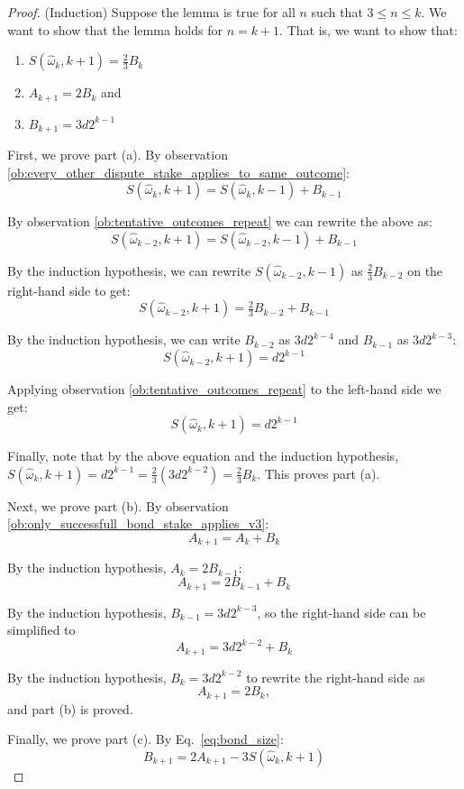 \documentclass[floatfix,reprint,nofootinbib,amsmath,amssymb,epsfig,pre,floats,letterpaper,groupedaffiliation]{revtex4-1}
\theoremstyle{definition}
\theoremstyle{definition}
\begin{document}
\begin{appendix}
\begin{proof}
\vspace{4mm}

(Induction)
Suppose the lemma is true for all $n$ such that $3 \leq n \leq k$.  We want to show that the lemma holds for $n=k+1$.  That is, we want to show that:

\begin{enumerate}[label=(\alph*)]
\item{$S(\hat{\omega}_{k},k+1)=\frac{2}{3}B_{k}$}
\item{$A_{k+1}=2B_{k}$ and}
\item{$B_{k+1}=3d2^{k-1}$}
\end{enumerate}

First, we prove part (a). By observation \ref{ob:every_other_dispute_stake_applies_to_same_outcome}:
\[ S(\hat{\omega}_{k},k+1)=S(\hat{\omega}_{k},k-1)+B_{k-1} \]

By observation \ref{ob:tentative_outcomes_repeat} we can rewrite the above as:
\[ S(\hat{\omega}_{k-2},k+1)=S(\hat{\omega}_{k-2},k-1)+B_{k-1} \]

By the induction hypothesis, we can rewrite $S(\hat{\omega}_{k-2},k-1)$ as $\frac{2}{3}B_{k-2}$ on the right-hand side to get:
\[ S(\hat{\omega}_{k-2},k+1)=\tfrac{2}{3}B_{k-2}+B_{k-1} \]

By the induction hypothesis, we can write $B_{k-2}$ as $3d2^{k-4}$ and $B_{k-1}$ as $3d2^{k-3}$:
\[ S(\hat{\omega}_{k-2},k+1)=d2^{k-1} \]

Applying observation \ref{ob:tentative_outcomes_repeat} to the left-hand side we get:
\[ S(\hat{\omega}_{k},k+1)=d2^{k-1} \]

Finally, note that by the above equation and the induction hypothesis, $S(\hat{\omega}_{k},k+1)=d2^{k-1}=\frac{2}{3}(3d2^{k-2})=\frac{2}{3}B_{k}$. This proves part (a).

Next, we prove part (b). By observation \ref{ob:only_successfull_bond_stake_applies_v3}:
\[ A_{k+1}=A_{k}+B_{k} \]

By the induction hypothesis, $A_{k}=2B_{k-1}$:
\[ A_{k+1}=2B_{k-1}+B_{k} \]

By the induction hypothesis, $B_{k-1}=3d2^{k-3}$, so the right-hand side can be simplified to
\[ A_{k+1}=3d2^{k-2}+B_k \]

By the induction hypothesis, $B_{k}=3d2^{k-2}$ to rewrite the right-hand side as
\[ A_{k+1}=2B_{k}, \]
and part (b) is proved.

Finally, we prove part (c).  By Eq.~\ref{eq:bond_size}:
\[ B_{k+1}=2A_{k+1}-3S(\hat{\omega}_{k},k+1) \]


\end{proof}
\end{appendix}
\end{document}
